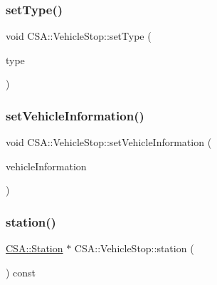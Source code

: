 \subsubsection{\texorpdfstring{set\+Type()}{setType()}}
{\footnotesize\ttfamily void C\+S\+A\+::\+Vehicle\+Stop\+::set\+Type (\begin{DoxyParamCaption}\item[{const \mbox{\hyperlink{classCSA_1_1VehicleStop_a7c2030d5a49808cb8e6fefaa691a76e0}{C\+S\+A\+::\+Vehicle\+Stop\+::\+Type}} \&}]{type }\end{DoxyParamCaption})}

\mbox{\label{classCSA_1_1VehicleStop_ac5985077bb7570364bac137c4888c859}} 
\subsubsection{\texorpdfstring{set\+Vehicle\+Information()}{setVehicleInformation()}}
{\footnotesize\ttfamily void C\+S\+A\+::\+Vehicle\+Stop\+::set\+Vehicle\+Information (\begin{DoxyParamCaption}\item[{\mbox{\hyperlink{classCSA_1_1Vehicle}{C\+S\+A\+::\+Vehicle}} $\ast$}]{vehicle\+Information }\end{DoxyParamCaption})}

\mbox{\label{classCSA_1_1VehicleStop_ae1c6e68ec554e65041a2f577433f314d}} 
\subsubsection{\texorpdfstring{station()}{station()}}
{\footnotesize\ttfamily \mbox{\hyperlink{classCSA_1_1Station}{C\+S\+A\+::\+Station}} $\ast$ C\+S\+A\+::\+Vehicle\+Stop\+::station (\begin{DoxyParamCaption}{ }\end{DoxyParamCaption}) const}

\mbox{\label{classCSA_1_1VehicleStop_a8cee8183966bb993b1dcc3ca26a483a9}} 
